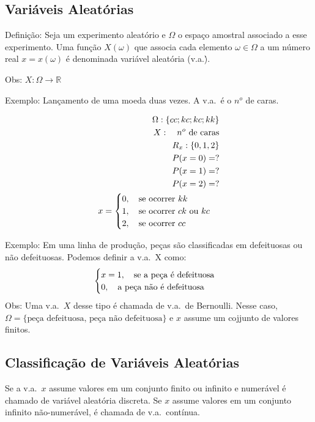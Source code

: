 \documentclass[11pt,a4paper]{book}
\begin{document}
\begin{enumerate}[label=(\alph*)]
\begin{enumerate}
\section{Variáveis Aleatórias}
Definição: Seja um experimento aleatório e $\Omega$ o espaço amostral associado 
a esse experimento. Uma função $X(\omega)$ que associa cada elemento $\omega \in
\Omega$ a um número real $x=x(\omega)$ é denominada variável aleatória (v.a.\.). 
\begin{figure} 
\end{figure}
Obs: $X:\Omega \to \mathbb{R}$

Exemplo: Lançamento de uma moeda duas vezes. A v.a.\ é o $n^o$ de caras. 

\begin{align*}
  \Omega : \{ cc;kc;kc;kk \}\\
  X: \text{\quad $n^o$ de caras}\\
  R_x: \{0,1,2 \}\\
  P(x=0)=?\\
  P(x=1)=? \\
  P(x=2)=? \\
  x=
  \begin{cases}
    0, \text{\quad se ocorrer $kk$} \\
    1, \text{\quad se ocorrer $ck$ ou $kc$} \\
    2,\text{\quad se ocorrer $cc$}
  \end{cases}
\end{align*}

Exemplo: Em uma linha de produção, peças são classificadas em defeituosas ou não
defeituosas. Podemos definir a v.a.\ X como:
\begin{align*}
  \begin{cases}
    x=1,\text{\quad  se a peça é defeituosa}\\ 
    0,\text{\quad  a peça não é defeituosa}
  \end{cases}
\end{align*}
Obs: Uma v.a.\ $X$ desse tipo é chamada de v.a.\ de Bernoulli. Nesse caso, $\Omega=\{ \text{peça defeituosa, peça não defeituosa} \}$
e $x$ assume um cojjunto de valores finitos.

\subsection{Classificação de Variáveis Aleatórias}
Se a v.a.\ $x$ assume valores em um conjunto finito ou infinito e numerável é chamado 
de variável aleatória discreta. Se $x$ assume valores em um conjunto infinito não-numerável,
é chamada de v.a.\ contínua.


\end{enumerate}
\end{enumerate}
\end{document}
